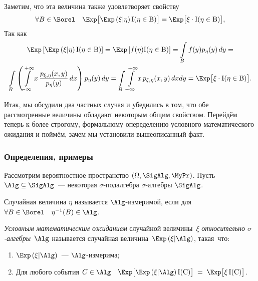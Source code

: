     \vspace{5mm}
    Заметим, что эта величина также удовлетворяет свойству
    \begin{equation*}
        \forall B \in \Borel \quad \Exp \bigl[ \Exp \left( \xi | \eta\right) \rm{I}(\eta \in B)\bigr] = 
        \Exp \bigl[ \xi \cdot \rm{I}(\eta \in B) \bigr],
    \end{equation*}
    Так как
    \begin{gather*}
        \Exp \left[ \Exp \left(\xi | \eta\right) \rm{I}(\eta \in B) \right] = 
        \Exp \left[ f(\eta) \rm{I}(\eta \in B) \right] = 
        \int\limits_{B} f(y) p_{\eta}(y)\,dy = \\
        \int\limits_{B} \left( \int\limits_{-\infty}^{+\infty} x \, \frac{p_{\xi, \eta}(x, y)}{p_{\eta}(y)} \, dx \right) p_{\eta}(y) \,dy = 
        \int\limits_{B} \int\limits_{-\infty}^{+\infty} x \, p_{\xi, \eta}(x, y) \,dxdy = 
        \Exp \bigl[ \xi \cdot \rm{I}(\eta \in B)\bigr].
    \end{gather*}

    Итак, мы обсудили два частных случая и убедились в том, что обе рассмотренные величины обладают некоторым общим свойством.
    Перейдём теперь к более строгому, формальному опеределению условного математического ожидания и поймём, зачем мы установили вышеописанный факт.

\subsubsection{Определения, примеры}
    Рассмотрим вероятностное пространство $(\Omega, \SigAlg, \MyPr)$.
    Пусть $\Alg \subseteq \SigAlg$~--- некоторая $\sigma$-подалгебра $\sigma$-алгебры $\SigAlg$.
    \begin{defn}
        Случайная величина $\eta$ называется $\Alg$-измеримой, если для $\forall B \in \Borel \quad \eta^{-1}(B) \in \Alg$.
    \end{defn}
    
    \begin{defn}
        \textit{Условным математическим ожиданием} случайной величины~$\xi$ \textit{относительно $\sigma$-алгебры}~$\Alg$ 
        называется случайная величина~$\Exp \left( \xi | \Alg\right)$, такая~что:
        \begin{enumerate}
            \item $\Exp \left(\xi | \Alg \right)$~--- $\Alg$-измерима;
            \item Для любого события $C \in \Alg \quad \Exp \bigl[ \Exp \left( \xi | \Alg \right) \rm{I}(C) \bigr] \; = \; \Exp \bigl[ \xi \, \rm{I}(C) \bigr]$.
        \end{enumerate}
    \end{defn}


